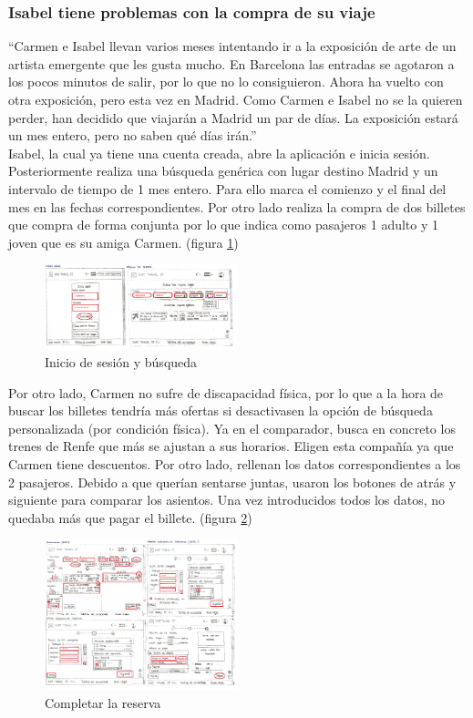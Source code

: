 \subsubsection{Isabel tiene problemas con la compra de su viaje}
“Carmen e Isabel llevan varios meses intentando ir a la exposición de arte de un artista emergente que les gusta mucho. En Barcelona las entradas se agotaron a los pocos minutos de salir, por lo que no lo consiguieron. Ahora ha vuelto con otra exposición, pero esta vez en Madrid.
Como Carmen e Isabel no se la quieren perder, han decidido que viajarán a Madrid un par de días. La exposición estará un mes entero, pero no saben qué días irán.” \\

Isabel, la cual ya tiene una cuenta creada, abre la aplicación e inicia sesión. Posteriormente realiza una búsqueda genérica con lugar destino Madrid y un intervalo de tiempo de 1 mes entero. Para ello marca el comienzo y el final del mes en las fechas correspondientes. Por otro lado realiza la compra de dos billetes que compra de forma conjunta por lo que indica como pasajeros 1 adulto y 1 joven que es su amiga Carmen. (figura \ref{fig:Isabel5})
\begin{figure}[h]
    \centering
    \includegraphics[width=0.5\textwidth]{Imagenes/Keypath/Isabel5.png}
    \caption{Inicio de sesión y búsqueda}
    \label{fig:Isabel5}
\end{figure}

Por otro lado, Carmen no sufre de discapacidad física, por lo que a la hora de buscar los billetes tendría más ofertas si desactivasen la opción de búsqueda personalizada (por condición física).
Ya en el comparador, busca en concreto los trenes de Renfe que más se ajustan a sus horarios. Eligen esta compañía ya que Carmen tiene descuentos. Por otro lado, rellenan los datos correspondientes a los 2 pasajeros. Debido a que querían sentarse juntas, usaron los botones de atrás y siguiente para comparar los asientos. 
Una vez introducidos todos los datos, no quedaba más que pagar el billete. (figura \ref{fig:Isabel6})
\begin{figure}[h]
    \centering
    \includegraphics[width=0.5\textwidth]{Imagenes/Keypath/Isabel6.png}
    \caption{Completar la reserva}
    \label{fig:Isabel6}
\end{figure}

